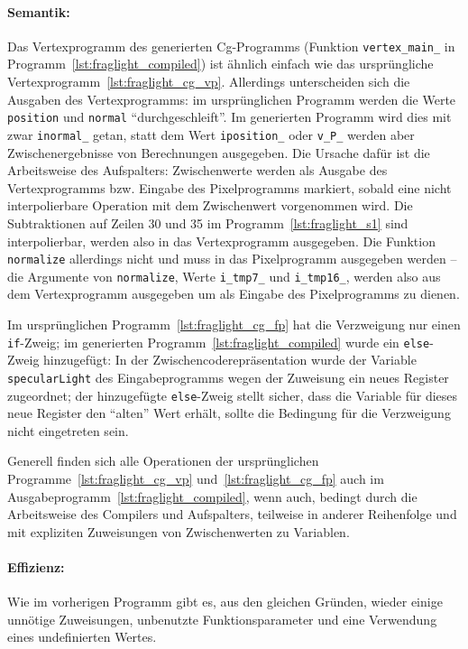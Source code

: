 \documentclass[twoside,a4paper,fleqn,12pt]{book}
\begin{document}
\paragraph{Semantik:}
Das Vertexprogramm des generierten Cg-Programms (Funktion \verb+vertex_main_+ in Programm~\ref{lst:fraglight_compiled})
ist ähnlich einfach wie das ursprüngliche Vertexprogramm~\ref{lst:fraglight_cg_vp}.
Allerdings unterscheiden sich die Ausgaben des Vertexprogramms: im ursprünglichen Programm
werden die Werte \verb+position+ und \verb+normal+ "`durchgeschleift"'. Im generierten Programm wird
dies mit zwar \verb+inormal_+ getan, statt dem Wert \verb+iposition_+ oder \verb+v_P_+ werden aber
Zwischenergebnisse von Berechnungen ausgegeben. Die Ursache dafür ist die Arbeitsweise des Aufspalters:
Zwischenwerte werden als Ausgabe des Vertexprogramms bzw. Eingabe des Pixelprogramms markiert,
sobald eine nicht interpolierbare Operation mit dem Zwischenwert vorgenommen wird.
Die Subtraktionen auf Zeilen 30 und 35 im Programm~\ref{lst:fraglight_s1} sind interpolierbar, werden
also in das Vertexprogramm ausgegeben. Die Funktion \verb+normalize+ allerdings nicht und 
muss in das Pixelprogramm ausgegeben werden -- die Argumente von \verb+normalize+, Werte \verb+i_tmp7_+ und
\verb+i_tmp16_+, werden also aus dem Vertexprogramm ausgegeben um als Eingabe des Pixelprogramms
zu dienen.

Im ursprünglichen Programm~\ref{lst:fraglight_cg_fp} hat die Verzweigung nur einen \verb+if+-Zweig; im generierten
Programm~\ref{lst:fraglight_compiled} wurde ein \verb+else+-Zweig hinzugefügt: In der Zwischencoderepräsentation
wurde der Variable \verb+specularLight+ des Eingabeprogramms wegen der Zuweisung ein neues Register zugeordnet;
der hinzugefügte \verb+else+-Zweig stellt sicher, dass die Variable für dieses neue Register den "`alten"' Wert erhält,
sollte die Bedingung für die Verzweigung nicht eingetreten sein.

Generell finden sich alle Operationen der ursprünglichen Programme~\ref{lst:fraglight_cg_vp} und~\ref{lst:fraglight_cg_fp}
auch im Ausgabeprogramm~\ref{lst:fraglight_compiled}, wenn auch, bedingt durch die Arbeitsweise des
Compilers und Aufspalters, teilweise in anderer Reihenfolge und mit expliziten Zuweisungen von Zwischenwerten zu Variablen.

\paragraph{Effizienz:}
Wie im vorherigen Programm gibt es, aus den gleichen Gründen, wieder einige unnötige Zuweisungen,
unbenutzte Funktionsparameter und eine Verwendung eines undefinierten Wertes.
\end{document}
